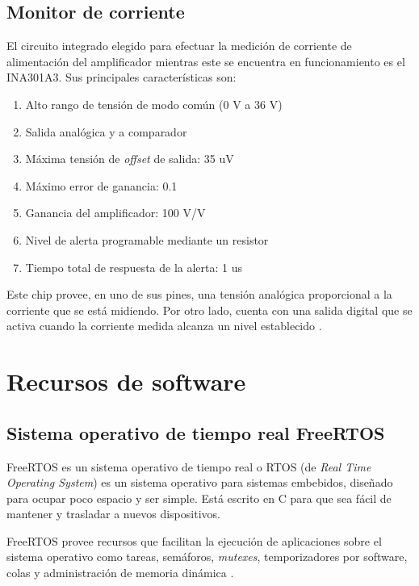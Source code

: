 \subsection{Monitor de corriente}

El circuito integrado elegido para efectuar la medición de corriente de alimentación del amplificador mientras este se encuentra en funcionamiento es el INA301A3. Sus principales características son:

\begin{enumerate}
\item Alto rango de tensión de modo común (0 V a 36 V)
\item Salida analógica y a comparador
\item Máxima tensión de \textit{offset} de salida: 35 uV
\item Máximo error de ganancia: 0.1%
\item Ganancia del amplificador: 100 V/V
\item Nivel de alerta programable mediante un resistor
\item Tiempo total de respuesta de la alerta: 1 us
\end{enumerate}

Este chip provee, en uno de sus pines, una tensión analógica proporcional a la corriente que se está midiendo. Por otro lado, cuenta con una salida digital que se activa cuando la corriente medida alcanza un nivel establecido \citep{INA301}.

\section{Recursos de software}

\subsection{Sistema operativo de tiempo real FreeRTOS}

FreeRTOS es un sistema operativo de tiempo real o RTOS (de \textit{Real Time Operating System}) es un sistema operativo para sistemas embebidos, diseñado para ocupar poco espacio y ser simple. Está escrito en C para que sea fácil de mantener y trasladar a nuevos dispositivos.

FreeRTOS provee recursos que facilitan la ejecución de aplicaciones sobre el sistema operativo como tareas, semáforos, \textit{mutexes}, temporizadores por software, colas y administración de memoria dinámica \citep{WEBSITE:1}.

